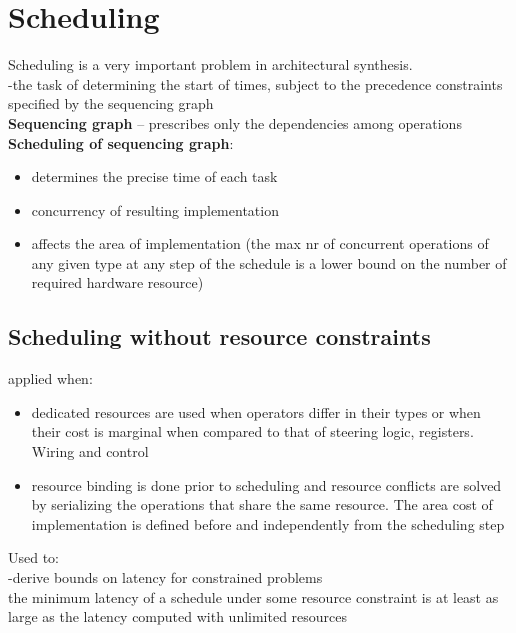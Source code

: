 \documentclass[conference]{IEEEtran}
\begin{document}
\section{Scheduling}

Scheduling is a very important problem in architectural synthesis.\\

-the task of determining the start of times, subject to the precedence constraints specified by the sequencing graph\\

\textbf{Sequencing graph} – prescribes only the dependencies among operations\\

\textbf{Scheduling of sequencing graph}:

\begin{itemize}

\item determines the precise time of each task
\item concurrency of resulting implementation
\item affects the area of implementation (the max nr of concurrent operations of any given type at any step of the schedule is a lower bound on the number of required hardware resource)
\end{itemize}

\subsection{Scheduling without resource constraints}

applied when:

\begin{itemize}
\item dedicated resources are used
\subitem	when operators differ in their types
\subitem 	or when their cost is marginal when compared to that of steering logic, registers. Wiring and control
\item	resource binding is done prior to scheduling and resource conflicts are solved by serializing the operations that share the same resource.
\subitem The area cost of implementation is defined before and independently from the scheduling step
\end{itemize}
Used to:\\

-derive bounds on latency for constrained problems\\

 the minimum latency of a schedule under some resource constraint is at least as large as the latency computed with unlimited resources\\
 
\end{document}
